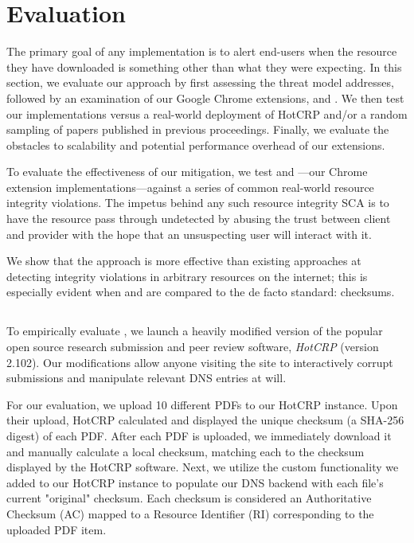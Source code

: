 \section{Evaluation} \label{sec:evaluation}

The primary goal of any \SYSTEM{} implementation is to alert end-users when the
resource they have downloaded is something other than what they were expecting.
In this section, we evaluate our approach by first assessing the threat model
\SYSTEM{} addresses, followed by an examination of our Google Chrome extensions,
\DNSSYS{} and \DHTSYS{}. We then test our implementations versus a real-world
deployment of HotCRP and/or a random sampling of papers published in previous
\CONFERENCE{} proceedings. Finally, we evaluate the obstacles to scalability and
potential performance overhead of our extensions.


To evaluate the effectiveness of our mitigation, we test \DNSSYS{} and
\DHTSYS{}---our \SYSTEM{} Chrome extension implementations---against a series of
common real-world resource integrity violations. The impetus behind any such
resource integrity SCA is to have the resource pass through undetected by
abusing the trust between client and provider with the hope that an unsuspecting
user will interact with it.

We show that the \SYSTEM{} approach is more effective than existing approaches
at detecting integrity violations in arbitrary resources on the internet; this
is especially evident when \DNSSYS{} and \DHTSYS{} are compared to the de facto
standard: checksums.

\subsection{\DNSSYS{}}

To empirically evaluate \DNSSYS{}, we launch a heavily modified version of the
popular open source research submission and peer review software, \emph{HotCRP}
(version 2.102). Our modifications allow anyone visiting the site to
interactively corrupt submissions and manipulate relevant DNS entries at will.

For our evaluation, we upload 10 different \CONFERENCE{} PDFs to our HotCRP
instance. Upon their upload, HotCRP calculated and displayed the unique checksum
(a SHA-256 digest) of each PDF. After each PDF is uploaded, we immediately
download it and manually calculate a local checksum, matching each to the
checksum displayed by the HotCRP software. Next, we utilize the custom
functionality we added to our HotCRP instance to populate our DNS backend with
each file's current "original" checksum. Each checksum is considered an
Authoritative Checksum (AC) mapped to a Resource Identifier (RI) corresponding
to the uploaded PDF item.

